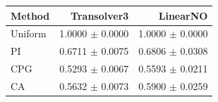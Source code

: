 \begin{tabular}{lrr}
\toprule
Method & Transolver3 & LinearNO \\
\midrule
Uniform & 1.0000 $\pm$ 0.0000 & 1.0000 $\pm$ 0.0000 \\
PI & 0.6711 $\pm$ 0.0075 & 0.6806 $\pm$ 0.0308 \\
CPG & 0.5293 $\pm$ 0.0067 & 0.5593 $\pm$ 0.0211 \\
CA & 0.5632 $\pm$ 0.0073 & 0.5900 $\pm$ 0.0259 \\
\bottomrule
\end{tabular}

